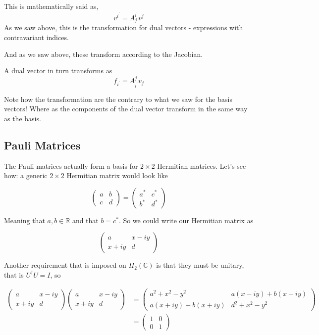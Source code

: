 This is mathematically said as,
$$
v^{i^\prime} = A^{i^\prime}_{j} v^j
$$
As we saw above, this is the transformation for dual vectors - expressions with contravariant indices.

And as we saw above, these transform according to the Jacobian.

A dual vector in turn transforms as
$$
f_{i^\prime} = A_{i^\prime}^{j} v_j
$$

Note how the transformation are the contrary to what we saw for the basis vectors!
Where as the components of the dual vector transform in the same way as the basis.









\subsection{Pauli Matrices}

The Pauli matrices actually form a basis for $2 \times 2$ Hermitian matrices.
Let's see how: a generic $2 \times 2$ Hermitian matrix would look like

$$
\begin{pmatrix}
a & b\\
c & d
\end{pmatrix}
=
\begin{pmatrix}
a^* & c^* \\
b^* & d^*
\end{pmatrix}
$$

Meaning that $a, b \in \mathbb{R}$ and that $b = c^*$.
So we could write our Hermitian matrix as

$$
\begin{pmatrix}
a      & x - iy \\
x + iy & d
\end{pmatrix}
$$

Another requirement that is imposed on $H_2 (\mathbb{C})$ is that they must be unitary, that is $U^\dagger U = I$, so

\begin{align*}
\begin{pmatrix}
a      & x - iy \\
x + iy & d
\end{pmatrix}
\begin{pmatrix}
a      & x - iy \\
x + iy & d
\end{pmatrix}
&=
\begin{pmatrix}
a^2 + x^2 - y^2         & a(x - iy) + b(x - iy) \\
a(x + iy) + b(x + iy) & d^2 + x^2 - y^2
\end{pmatrix}
\\
&=
\begin{pmatrix}
1 & 0 \\
0 & 1
\end{pmatrix}
\end{align*}

